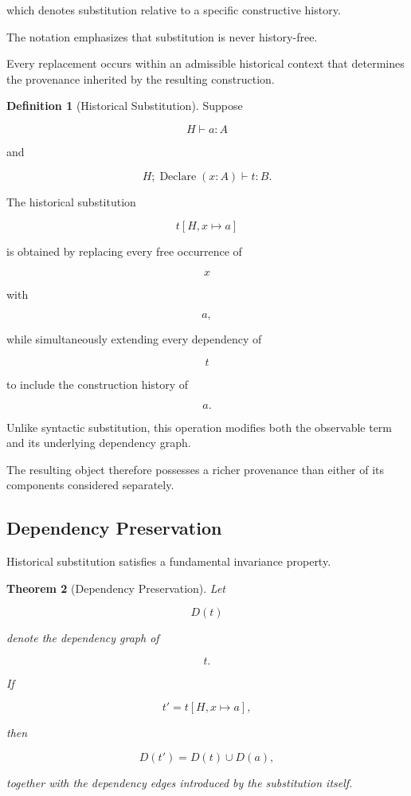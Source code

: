 \documentclass[12pt,oneside]{article}
\newtheorem{theorem}{Theorem}[section]
\theoremstyle{definition}
\newtheorem{definition}[theorem]{Definition}
\theoremstyle{remark}
\begin{document}
which denotes substitution relative to a specific constructive history.

The notation emphasizes that substitution is never history-free.

Every replacement occurs within an admissible historical context that determines
the provenance inherited by the resulting construction.

\begin{definition}[Historical Substitution]

Suppose

\[
H
\vdash
a:A
\]

and

\[
H;
\operatorname{Declare}(x:A)
\vdash
t:B.
\]

The historical substitution

\[
t[H,x\mapsto a]
\]

is obtained by replacing every free occurrence of

\[
x
\]

with

\[
a,
\]

while simultaneously extending every dependency of

\[
t
\]

to include the construction history of

\[
a.
\]

\end{definition}

Unlike syntactic substitution, this operation modifies both the observable term
and its underlying dependency graph.

The resulting object therefore possesses a richer provenance than either of its
components considered separately.

\subsection{Dependency Preservation}

Historical substitution satisfies a fundamental invariance property.

\begin{theorem}[Dependency Preservation]

Let

\[
D(t)
\]

denote the dependency graph of

\[
t.
\]

If

\[
t'
=
t[H,x\mapsto a],
\]

then

\[
D(t')
=
D(t)
\cup
D(a),
\]

together with the dependency edges introduced by the substitution itself.

\end{theorem}
\end{document}
